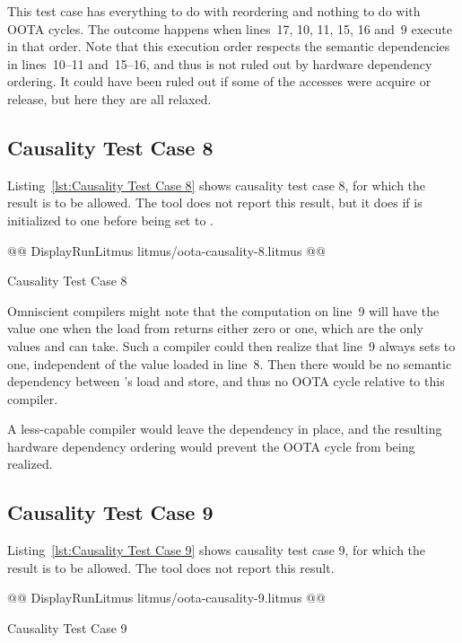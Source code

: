 \documentclass[10]{article}
\begin{document}
This test case has everything
to do with reordering and nothing to do with OOTA cycles.
The  outcome happens when lines~17, 10, 11,
15, 16 and~9 execute in that order.
Note that this execution order respects the semantic dependencies in
lines~10--11 and~15--16, and thus is not ruled out by hardware
dependency ordering.
It could have been ruled out if some of the accesses were acquire or
release, but here they are all relaxed.

\subsection{Causality Test Case 8}
\label{app:Causality Test Case 8}

Listing~\ref{lst:Causality Test Case 8}
shows causality test case 8, for which the 
result is to be allowed.
The  tool does not report this result, but it does if
 is initialized to one before being set to
.

\begin{listing}[tbp]
@@ DisplayRunLitmus litmus/oota-causality-8.litmus @@
\caption{Causality Test Case 8}
\label{lst:Causality Test Case 8}
\end{listing}

Omniscient compilers might note that the computation on line~9
will have the value one when the load from  returns either
zero or one, which are the only values  and  can take.
Such a compiler could then realize that line~9 always sets  to one,
independent of the value loaded in line~8.
Then there would be no semantic dependency between 's load
and store, and thus no OOTA cycle relative to this compiler.

A less-capable compiler would leave the dependency in place,
and the resulting hardware dependency ordering would prevent
the OOTA cycle from being realized.

\subsection{Causality Test Case 9}
\label{app:Causality Test Case 9}

Listing~\ref{lst:Causality Test Case 9}
shows causality test case 9, for which the 
result is to be allowed.
The  tool does not report this result.

\begin{listing}[tbp]
@@ DisplayRunLitmus litmus/oota-causality-9.litmus @@
\caption{Causality Test Case 9}
\label{lst:Causality Test Case 9}
\end{listing}
\end{document}
